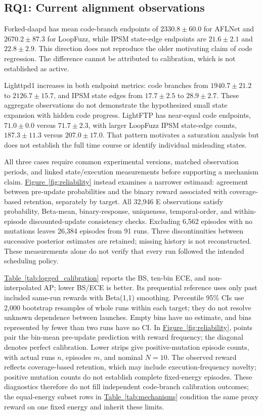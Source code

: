 \documentclass[final,5p,times,number]{elsarticle}
\newcommand{\namedref}[2]{\hyperref[#2]{#1~\ref*{#2}}}
\begin{document}
\subsection{RQ1: Current alignment observations}
Forked-daapd has mean code-branch endpoints of $2330.8\pm60.0$ for AFLNet and $2670.2\pm87.3$ for LoopFuzz, while IPSM state-edge endpoints are $21.6\pm2.1$ and $22.8\pm2.9$. This direction does not reproduce the older motivating claim of code regression. The difference cannot be attributed to calibration, which is not established as active.

Lighttpd1 increases in both endpoint metrics: code branches from $1940.7\pm21.2$ to $2126.7\pm15.7$, and IPSM state edges from $17.7\pm2.5$ to $28.9\pm2.7$. These aggregate observations do not demonstrate the hypothesized small state expansion with hidden code progress. LightFTP has near-equal code endpoints, $71.0\pm0.0$ versus $71.7\pm2.3$, with larger LoopFuzz IPSM state-edge counts, $187.3\pm11.3$ versus $207.0\pm17.0$. That pattern motivates a saturation analysis but does not establish the full time course or identify individual misleading states.

All three cases require common experimental versions, matched observation periods, and linked state/execution measurements before supporting a mechanism claim. \namedref{Figure}{fig:reliability} instead examines a narrower estimand: agreement between pre-update probabilities and the binary reward associated with coverage-based retention, separately by target. All 32,946 E observations satisfy probability, Beta-mean, binary-response, uniqueness, temporal-order, and within-episode discounted-update consistency checks. Excluding 6,562 episodes with no mutations leaves 26,384 episodes from 91 runs. Three discontinuities between successive posterior estimates are retained; missing history is not reconstructed. These measurements alone do not verify that every run followed the intended scheduling policy.

\namedref{Table}{tab:logged_calibration} reports the BS, ten-bin ECE, and non-interpolated AP; lower BS/ECE is better. Its prequential reference uses only past included same-run rewards with Beta(1,1) smoothing. Percentile 95\% CIs use 2,000 bootstrap resamples of whole runs within each target; they do not resolve unknown dependence between launches. Empty bins have no estimate, and bins represented by fewer than two runs have no CI. In \namedref{Figure}{fig:reliability}, points pair the bin-mean pre-update prediction with reward frequency; the diagonal denotes perfect calibration. Lower strips give positive-mutation episode counts, with actual runs $n$, episodes $m$, and nominal $N=10$. The observed reward reflects coverage-based retention, which may include execution-frequency novelty; positive mutation counts do not establish complete fixed-energy episodes. These diagnostics therefore do not fill independent code-branch calibration outcomes; the equal-energy subset rows in \namedref{Table}{tab:mechanisms} condition the same proxy reward on one fixed energy and inherit these limits.
\end{document}
